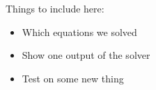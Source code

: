 Things to include here:
\begin{itemize}
  \item Which equations we solved
  \item Show one output of the solver
  \item Test on some new thing 
\end{itemize}
